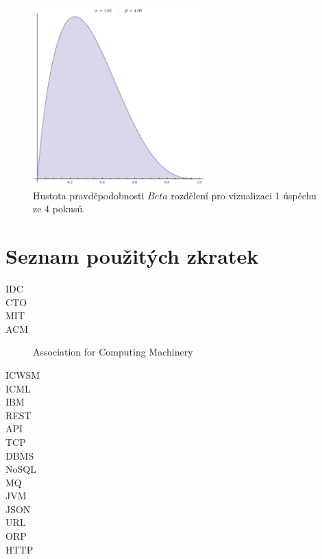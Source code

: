 \documentclass[thesis=M,czech]{FITthesis}[2014/05/07]
\begin{document}
\begin{figure}\centering
	\includegraphics[width=0.6\textwidth]{obr/beta2.png}
 	\caption[Hustota pravděpodobnosti $Beta$ rozdělení pro vizualizaci 1 úspěchu ze 4 pokusů.]{Hustota pravděpodobnosti $Beta$ rozdělení pro vizualizaci 1 úspěchu ze 4 pokusů.}\label{fig:beta2}
\end{figure}	

\chapter{Seznam použitých zkratek}
\begin{description}
	\item[IDC] 
	\item[CTO]
	\item[MIT]	
	\item[ACM] Association for Computing Machinery	
	\item[ICWSM]	
	\item[ICML]	
	\item[IBM]	
	\item[REST]	
	\item[API]							
	\item[TCP]
	\item[DBMS]
	\item[NoSQL]
	\item[MQ]
	\item[JVM]
	\item[JSON]
	\item[URL]
	\item[ORP]
	\item[HTTP]
\end{description}
\end{document}
